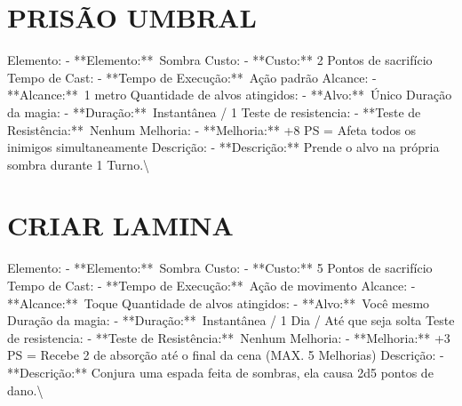 \documentclass{article}%
\begin{document}
\section{PRISÃO UMBRAL}%
\label{sec:PRISOUMBRAL}%
Elemento: {-} **Elemento:**~Sombra\newline%
Custo: {-} **Custo:** 2 Pontos de sacrifício\newline%
Tempo de Cast: {-} **Tempo de Execução:**~Ação padrão\newline%
Alcance: {-} **Alcance:**~1 metro\newline%
Quantidade de alvos atingidos: {-} **Alvo:**~Único\newline%
Duração da magia: {-} **Duração:**~Instantânea / 1\newline%
Teste de resistencia: {-} **Teste de Resistência:**~Nenhum\newline%
Melhoria: {-} **Melhoria:** +8 PS = Afeta todos os inimigos simultaneamente\newline%
Descrição: {-} **Descrição:** Prende o alvo na própria sombra durante 1 Turno.\textbackslash{}

%
\section{CRIAR LAMINA}%
\label{sec:CRIARLAMINA}%
Elemento: {-} **Elemento:**~Sombra\newline%
Custo: {-} **Custo:** 5 Pontos de sacrifício\newline%
Tempo de Cast: {-} **Tempo de Execução:**~Ação de movimento\newline%
Alcance: {-} **Alcance:**~Toque\newline%
Quantidade de alvos atingidos: {-} **Alvo:**~Você mesmo\newline%
Duração da magia: {-} **Duração:**~Instantânea / 1 Dia / Até que seja solta\newline%
Teste de resistencia: {-} **Teste de Resistência:**~Nenhum\newline%
Melhoria: {-} **Melhoria:** +3 PS = Recebe 2 de absorção até o final da cena (MAX. 5 Melhorias)\newline%
Descrição: {-} **Descrição:** Conjura uma espada feita de sombras, ela causa 2d5 pontos de dano.\textbackslash{}

%
\end{document}
